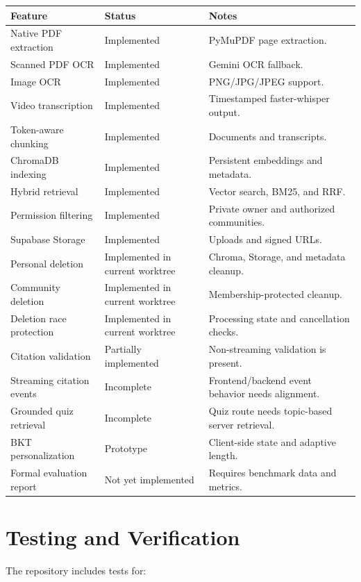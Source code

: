 \documentclass[11pt,a4paper]{article}
\begin{document}
\begin{longtable}{p{}p{}p{}}
\toprule
\textbf{Feature} & \textbf{Status} & \textbf{Notes} \\
\midrule
Native PDF extraction & Implemented & PyMuPDF page extraction. \\
Scanned PDF OCR & Implemented & Gemini OCR fallback. \\
Image OCR & Implemented & PNG/JPG/JPEG support. \\
Video transcription & Implemented & Timestamped faster-whisper output. \\
Token-aware chunking & Implemented & Documents and transcripts. \\
ChromaDB indexing & Implemented & Persistent embeddings and metadata. \\
Hybrid retrieval & Implemented & Vector search, BM25, and RRF. \\
Permission filtering & Implemented & Private owner and authorized communities. \\
Supabase Storage & Implemented & Uploads and signed URLs. \\
Personal deletion & Implemented in current worktree & Chroma, Storage, and metadata cleanup. \\
Community deletion & Implemented in current worktree & Membership-protected cleanup. \\
Deletion race protection & Implemented in current worktree & Processing state and cancellation checks. \\
Citation validation & Partially implemented & Non-streaming validation is present. \\
Streaming citation events & Incomplete & Frontend/backend event behavior needs alignment. \\
Grounded quiz retrieval & Incomplete & Quiz route needs topic-based server retrieval. \\
BKT personalization & Prototype & Client-side state and adaptive length. \\
Formal evaluation report & Not yet implemented & Requires benchmark data and metrics. \\
\bottomrule
\end{longtable}

\section{Testing and Verification}

The repository includes tests for:
\end{document}
